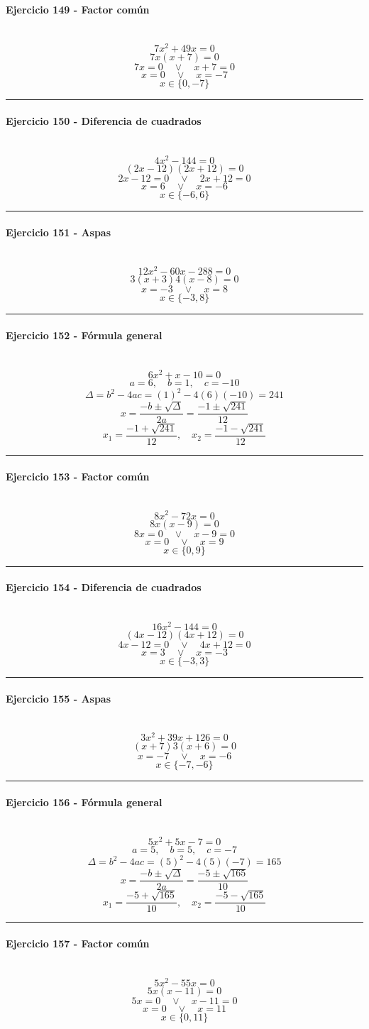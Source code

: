 \documentclass[10pt,a4paper]{article}
\newcommand{\res}[1]{\paragraph{#1}\mbox{}\\[-1.2em]}
\begin{document}
\res{Ejercicio 149 - Factor común}
\[ 7 x^{2} + 49 x=0 \]
\[ 7x(x+7)=0 \]
\[ 7x=0 \quad \vee \quad x+7=0 \]
\[ x=0 \quad \vee \quad x=-7 \]
\[ \boxed{x\in\{0,-7\}} \]
\vspace{1mm}\hrule\vspace{2mm}
\res{Ejercicio 150 - Diferencia de cuadrados}
\[ 4 x^{2} - 144=0 \]
\[ (2x-12)(2x+12)=0 \]
\[ 2x-12=0 \quad \vee \quad 2x+12=0 \]
\[ x=6 \quad \vee \quad x=-6 \]
\[ \boxed{x\in\{-6,6\}} \]
\vspace{1mm}\hrule\vspace{2mm}
\res{Ejercicio 151 - Aspas}
\[ 12 x^{2} - 60 x - 288=0 \]
\[ 3(x+3)4(x-8)=0 \]
\[ x=-3 \quad \vee \quad x=8 \]
\[ \boxed{x\in\{-3,8\}} \]
\vspace{1mm}\hrule\vspace{2mm}
\res{Ejercicio 152 - Fórmula general}
\[ 6 x^{2} + x - 10=0 \]
\[ a=6,\quad b=1,\quad c=-10 \]
\[ \Delta=b^2-4ac=(1)^2-4(6)(-10)=241 \]
\[ x=\frac{-b\pm\sqrt{\Delta}}{2a}=\frac{-1\pm\sqrt{241}}{12} \]
\[ \boxed{x_1=\frac{-1+\sqrt{241}}{12},\quad x_2=\frac{-1-\sqrt{241}}{12}} \]
\vspace{1mm}\hrule\vspace{2mm}
\res{Ejercicio 153 - Factor común}
\[ 8 x^{2} - 72 x=0 \]
\[ 8x(x-9)=0 \]
\[ 8x=0 \quad \vee \quad x-9=0 \]
\[ x=0 \quad \vee \quad x=9 \]
\[ \boxed{x\in\{0,9\}} \]
\vspace{1mm}\hrule\vspace{2mm}
\res{Ejercicio 154 - Diferencia de cuadrados}
\[ 16 x^{2} - 144=0 \]
\[ (4x-12)(4x+12)=0 \]
\[ 4x-12=0 \quad \vee \quad 4x+12=0 \]
\[ x=3 \quad \vee \quad x=-3 \]
\[ \boxed{x\in\{-3,3\}} \]
\vspace{1mm}\hrule\vspace{2mm}
\res{Ejercicio 155 - Aspas}
\[ 3 x^{2} + 39 x + 126=0 \]
\[ (x+7)3(x+6)=0 \]
\[ x=-7 \quad \vee \quad x=-6 \]
\[ \boxed{x\in\{-7,-6\}} \]
\vspace{1mm}\hrule\vspace{2mm}
\res{Ejercicio 156 - Fórmula general}
\[ 5 x^{2} + 5 x - 7=0 \]
\[ a=5,\quad b=5,\quad c=-7 \]
\[ \Delta=b^2-4ac=(5)^2-4(5)(-7)=165 \]
\[ x=\frac{-b\pm\sqrt{\Delta}}{2a}=\frac{-5\pm\sqrt{165}}{10} \]
\[ \boxed{x_1=\frac{-5+\sqrt{165}}{10},\quad x_2=\frac{-5-\sqrt{165}}{10}} \]
\vspace{1mm}\hrule\vspace{2mm}
\res{Ejercicio 157 - Factor común}
\[ 5 x^{2} - 55 x=0 \]
\[ 5x(x-11)=0 \]
\[ 5x=0 \quad \vee \quad x-11=0 \]
\[ x=0 \quad \vee \quad x=11 \]
\[ \boxed{x\in\{0,11\}} \]
\end{document}
